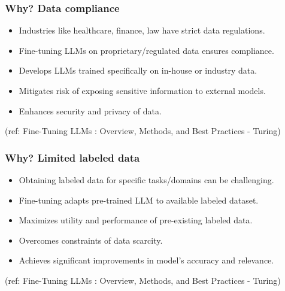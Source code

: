 \begin{frame}[fragile]\frametitle{Why? Data compliance}
  \begin{itemize}
    \item Industries like healthcare, finance, law have strict data regulations.
    \item Fine-tuning LLMs on proprietary/regulated data ensures compliance.
    \item Develops LLMs trained specifically on in-house or industry data.
    \item Mitigates risk of exposing sensitive information to external models.
    \item Enhances security and privacy of data.
  \end{itemize}
  
  {\tiny (ref: Fine-Tuning LLMs : Overview, Methods, and Best Practices - Turing)}
  
\end{frame}

\begin{frame}[fragile]\frametitle{Why? Limited labeled data}

  \begin{itemize}
    \item Obtaining labeled data for specific tasks/domains can be challenging.
    \item Fine-tuning adapts pre-trained LLM to available labeled dataset.
    \item Maximizes utility and performance of pre-existing labeled data.
    \item Overcomes constraints of data scarcity.
    \item Achieves significant improvements in model's accuracy and relevance.
  \end{itemize}
  
  {\tiny (ref: Fine-Tuning LLMs : Overview, Methods, and Best Practices - Turing)}
  
\end{frame}



